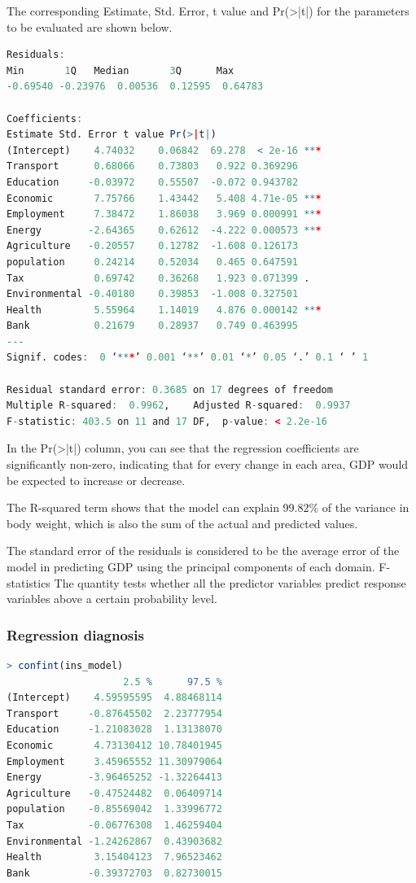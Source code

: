 \documentclass{apmcmthesis}
\begin{document}
The corresponding Estimate, Std. Error, t value and Pr(>|t|) for the parameters to be evaluated are shown below. 
\begin{lstlisting}[language=r]
Residuals:
Min       1Q   Median       3Q      Max 
-0.69540 -0.23976  0.00536  0.12595  0.64783 

Coefficients:
Estimate Std. Error t value Pr(>|t|)    
(Intercept)    4.74032    0.06842  69.278  < 2e-16 ***
Transport      0.68066    0.73803   0.922 0.369296    
Education     -0.03972    0.55507  -0.072 0.943782    
Economic       7.75766    1.43442   5.408 4.71e-05 ***
Employment     7.38472    1.86038   3.969 0.000991 ***
Energy        -2.64365    0.62612  -4.222 0.000573 ***
Agriculture   -0.20557    0.12782  -1.608 0.126173    
population     0.24214    0.52034   0.465 0.647591    
Tax            0.69742    0.36268   1.923 0.071399 .  
Environmental -0.40180    0.39853  -1.008 0.327501    
Health         5.55964    1.14019   4.876 0.000142 ***
Bank           0.21679    0.28937   0.749 0.463995    
---
Signif. codes:  0 ‘***’ 0.001 ‘**’ 0.01 ‘*’ 0.05 ‘.’ 0.1 ‘ ’ 1

Residual standard error: 0.3685 on 17 degrees of freedom
Multiple R-squared:  0.9962,	Adjusted R-squared:  0.9937 
F-statistic: 403.5 on 11 and 17 DF,  p-value: < 2.2e-16
\end{lstlisting}

In the Pr(>|t|) column, you can see that the regression coefficients are significantly non-zero, indicating that for every change in each area, GDP would be expected to increase or decrease.

The R-squared term shows that the model can explain 99.82\% of the variance in body weight, which is also the sum of the actual and predicted values.

The standard error of the residuals is considered to be the average error of the model in predicting GDP using the principal components of each domain. F-statistics
The quantity tests whether all the predictor variables predict response variables above a certain probability level.

\subsubsection{Regression diagnosis}
\begin{lstlisting}[language=r]
> confint(ins_model)
                    2.5 %      97.5 %
(Intercept)    4.59595595  4.88468114
Transport     -0.87645502  2.23777954
Education     -1.21083028  1.13138070
Economic       4.73130412 10.78401945
Employment     3.45965552 11.30979064
Energy        -3.96465252 -1.32264413
Agriculture   -0.47524482  0.06409714
population    -0.85569042  1.33996772
Tax           -0.06776308  1.46259404
Environmental -1.24262867  0.43903682
Health         3.15404123  7.96523462
Bank          -0.39372703  0.82730015
\end{lstlisting}
\end{document}
